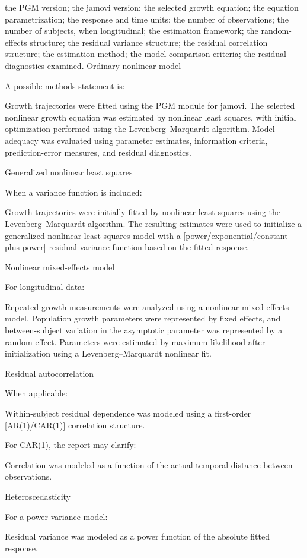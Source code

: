 \documentclass[
  english,
  letterpaper,
  DIV=11,
  numbers=noendperiod]{scrreprt}
\begin{document}
the PGM version; the jamovi version; the selected growth equation; the
equation parametrization; the response and time units; the number of
observations; the number of subjects, when longitudinal; the estimation
framework; the random-effects structure; the residual variance
structure; the residual correlation structure; the estimation method;
the model-comparison criteria; the residual diagnostics examined.
Ordinary nonlinear model

A possible methods statement is:

Growth trajectories were fitted using the PGM module for jamovi. The
selected nonlinear growth equation was estimated by nonlinear least
squares, with initial optimization performed using the
Levenberg--Marquardt algorithm. Model adequacy was evaluated using
parameter estimates, information criteria, prediction-error measures,
and residual diagnostics.

Generalized nonlinear least squares

When a variance function is included:

Growth trajectories were initially fitted by nonlinear least squares
using the Levenberg--Marquardt algorithm. The resulting estimates were
used to initialize a generalized nonlinear least-squares model with a
{[}power/exponential/constant-plus-power{]} residual variance function
based on the fitted response.

Nonlinear mixed-effects model

For longitudinal data:

Repeated growth measurements were analyzed using a nonlinear
mixed-effects model. Population growth parameters were represented by
fixed effects, and between-subject variation in the asymptotic parameter
was represented by a random effect. Parameters were estimated by maximum
likelihood after initialization using a Levenberg--Marquardt nonlinear
fit.

Residual autocorrelation

When applicable:

Within-subject residual dependence was modeled using a first-order
{[}AR(1)/CAR(1){]} correlation structure.

For CAR(1), the report may clarify:

Correlation was modeled as a function of the actual temporal distance
between observations.

Heteroscedasticity

For a power variance model:

Residual variance was modeled as a power function of the absolute fitted
response.
\end{document}

